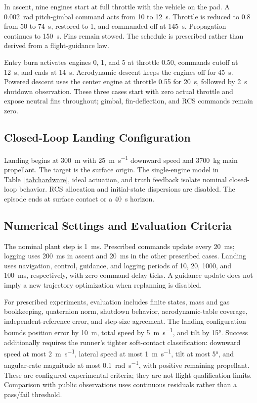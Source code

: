\documentclass[11pt,letterpaper]{article}
\begin{document}
In ascent, nine engines start at full throttle with the vehicle on the pad. A \SI{0.002}{\radian} pitch-gimbal command acts from 10 to \SI{12}{\second}. Throttle is reduced to 0.8 from 50 to \SI{74}{\second}, restored to 1, and commanded off at \SI{145}{\second}. Propagation continues to \SI{150}{\second}. Fins remain stowed. The schedule is prescribed rather than derived from a flight-guidance law.

Entry burn activates engines 0, 1, and 5 at throttle 0.50, commands cutoff at \SI{12}{\second}, and ends at \SI{14}{\second}. Aerodynamic descent keeps the engines off for \SI{45}{\second}. Powered descent uses the center engine at throttle 0.55 for \SI{20}{\second}, followed by \SI{2}{\second} shutdown observation. These three cases start with zero actual throttle and expose neutral fins throughout; gimbal, fin-deflection, and RCS commands remain zero.

\subsection{Closed-Loop Landing Configuration}
Landing begins at \SI{300}{\metre} with \SI{25}{\metre\per\second} downward speed and \SI{3700}{\kilogram} main propellant. The target is the surface origin. The single-engine model in Table~\ref{tab:hardware}, ideal actuation, and truth feedback isolate nominal closed-loop behavior. RCS allocation and initial-state dispersions are disabled. The episode ends at surface contact or a \SI{40}{\second} horizon.

\subsection{Numerical Settings and Evaluation Criteria}\label{sec:settings}
The nominal plant step is \SI{1}{\milli\second}. Prescribed commands update every \SI{20}{\milli\second}; logging uses \SI{200}{\milli\second} in ascent and \SI{20}{\milli\second} in the other prescribed cases. Landing uses navigation, control, guidance, and logging periods of 10, 20, 1000, and \SI{100}{\milli\second}, respectively, with zero command-delay ticks. A guidance update does not imply a new trajectory optimization when replanning is disabled.

For prescribed experiments, evaluation includes finite states, mass and gas bookkeeping, quaternion norm, shutdown behavior, aerodynamic-table coverage, independent-reference error, and step-size agreement. The landing configuration bounds position error by \SI{10}{\metre}, total speed by \SI{5}{\metre\per\second}, and tilt by \ang{15}. Success additionally requires the runner's tighter soft-contact classification: downward speed at most \SI{2}{\metre\per\second}, lateral speed at most \SI{1}{\metre\per\second}, tilt at most \ang{5}, and angular-rate magnitude at most \SI{0.1}{\radian\per\second}, with positive remaining propellant. These are configured experimental criteria; they are not flight qualification limits. Comparison with public observations uses continuous residuals rather than a pass/fail threshold.
\end{document}
